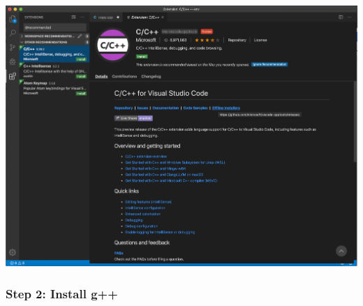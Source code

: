 \begin{itemize}
    \includegraphics[width=6in]{images/macVSCodeSetup/image6.png}

\end{itemize}

\subsubsection{Step 2: Install g++}

